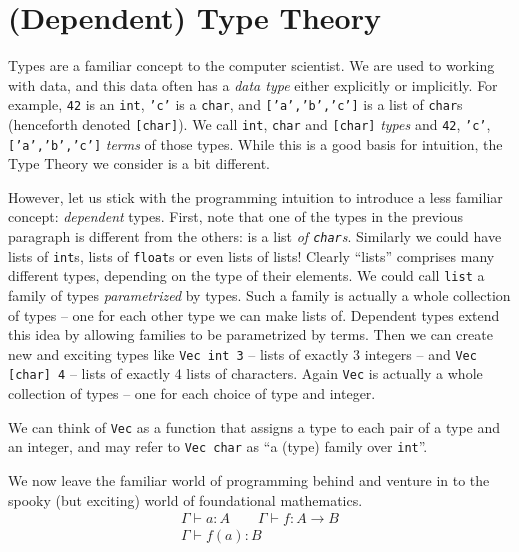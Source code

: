 \section{(Dependent) Type Theory}\label{sec/typetheory}
Types are a familiar concept to the computer scientist. We are used to working
with data, and this data often has a \emph{data type} either explicitly or
implicitly. For example, \texttt{42} is an \texttt{int}, \texttt{'c'} is a
\texttt{char}, and \texttt{['a','b','c']} is a list of \texttt{char}s (henceforth
denoted \texttt{[char]}). We call
\texttt{int}, \texttt{char} and \texttt{[char]} \emph{types} and
\texttt{42}, \texttt{'c'}, \texttt{['a','b','c']} \emph{terms} of those types.
While this is a good basis for intuition, the Type Theory we consider is a bit different.

However, let us stick with the programming intuition to introduce a less
familiar concept: \emph{dependent} types. First, note that one of the types in
the previous paragraph is different from the others: \text{['a','b','c']} is a
list \emph{of \texttt{char}s}. Similarly we could have lists of \texttt{int}s,
lists of \texttt{float}s or even lists of lists! Clearly ``lists'' comprises
many different types, depending on the type of their elements. We could call
\texttt{list} a family of types \emph{parametrized} by types. Such a family is
actually a whole collection of types -- one for each other type we can make
lists of.
Dependent types extend this idea by allowing families to be parametrized by
terms. Then we can create new and exciting types like \texttt{Vec int 3} --
lists of exactly 3 integers -- and \texttt{Vec [char] 4} -- lists of exactly 4
lists of characters. Again \texttt{Vec} is actually a whole collection of types
-- one for each choice of type and integer.

We can think of \texttt{Vec} as a function that assigns a type to each pair of a
type and an integer, and may refer to \texttt{Vec char} as ``a (type) family over \texttt{int}''.

We now leave the familiar world of programming behind and venture in to the spooky
(but exciting) world of foundational mathematics.
\begin{equation}
  \begin{array}{c}
    \Gamma \vdash a : A \qquad \Gamma \vdash f : A \rightarrow B\\
    \hline
    \Gamma \vdash f(a) : B
  \end{array}
  \label{rule:example}
\end{equation}

